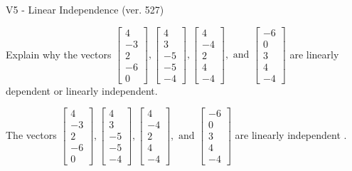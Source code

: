 \begin{exercise}
  \begin{exerciseTitle}V5 - Linear Independence (ver. 527)\end{exerciseTitle}
  \begin{exerciseStatement}
    Explain why the vectors \(\left[\begin{array}{r}
4 \\
-3 \\
2 \\
-6 \\
0
\end{array}\right] , \left[\begin{array}{r}
4 \\
3 \\
-5 \\
-5 \\
-4
\end{array}\right] , \left[\begin{array}{r}
4 \\
-4 \\
2 \\
4 \\
-4
\end{array}\right] , \text{ and } \left[\begin{array}{r}
-6 \\
0 \\
3 \\
4 \\
-4
\end{array}\right]\) are linearly dependent or linearly independent.	


  \end{exerciseStatement}
  \begin{exerciseAnswer}
   The vectors \(\left[\begin{array}{r}
4 \\
-3 \\
2 \\
-6 \\
0
\end{array}\right] , \left[\begin{array}{r}
4 \\
3 \\
-5 \\
-5 \\
-4
\end{array}\right] , \left[\begin{array}{r}
4 \\
-4 \\
2 \\
4 \\
-4
\end{array}\right] , \text{ and } \left[\begin{array}{r}
-6 \\
0 \\
3 \\
4 \\
-4
\end{array}\right]\) are 
  	 linearly independent  .
  


  \end{exerciseAnswer}
\end{exercise}